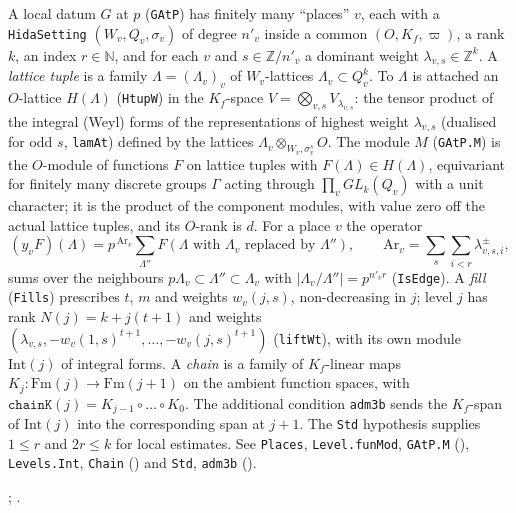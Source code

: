 \begin{definition}\label{def:G-local-forms}
A local datum $G$ at $p$ (\texttt{GAtP}) has finitely many ``places'' $v$, each with a \texttt{HidaSetting}
$(W_v,Q_v,\sigma_v)$ of degree $n'_v$ inside a common $(O,K_f,\varpi)$, a rank $k$, an index $r\in\mathbb N$, and for each
$v$ and $s\in\mathbb Z/n'_v$ a dominant weight $\lambda_{v,s}\in\mathbb Z^{k}$. A \emph{lattice tuple} is a family
$\Lambda=(\Lambda_v)_v$ of $W_v$-lattices $\Lambda_v\subset Q_v^{k}$. To $\Lambda$ is attached an $O$-lattice
$H(\Lambda)$ (\texttt{HtupW}) in the $K_f$-space $V=\bigotimes_{v,s}V_{\lambda_{v,s}}$: the tensor product of the
integral (Weyl) forms of the representations of highest weight $\lambda_{v,s}$ (dualised for odd $s$,
\texttt{lamAt}) defined by the lattices $\Lambda_v\otimes_{W_v,\sigma_v^{s}}O$.
The module $M$ (\texttt{GAtP.M}) is the $O$-module of functions $F$ on lattice tuples with $F(\Lambda)\in H(\Lambda)$,
equivariant for finitely many discrete groups $\Gamma$ acting through $\prod_v GL_k(Q_v)$ with a unit character;
it is the product of the component modules, with value zero off the actual lattice tuples, and its $O$-rank is $d$. For a place $v$ the operator
\[
  (y_vF)(\Lambda)=p^{\,\mathrm{Ar}_v}\sum_{\Lambda''}F(\Lambda\text{ with }\Lambda_v\text{ replaced by }\Lambda''),
  \qquad \mathrm{Ar}_v=\sum_{s}\sum_{i<r}\lambda^{\pm}_{v,s,i},
\]
sums over the neighbours $p\Lambda_v\subset\Lambda''\subset\Lambda_v$ with $|\Lambda_v/\Lambda''|=p^{n'_vr}$
(\texttt{IsEdge}). A \emph{fill} (\texttt{Fills}) prescribes $t$, $m$ and weights $w_{v}(j,s)$, non-decreasing in
$j$; level $j$ has rank $N(j)=k+j(t+1)$ and weights $(\lambda_{v,s},-w_v(1,s)^{t+1},\dots,-w_v(j,s)^{t+1})$
(\texttt{liftWt}), with its own module $\mathrm{Int}(j)$ of integral forms. A \emph{chain} is a family of
$K_f$-linear maps $K_j:\mathrm{Fm}(j)\to\mathrm{Fm}(j+1)$ on the ambient function spaces, with
$\texttt{chainK}(j)=K_{j-1}\circ\dots\circ K_0$. The additional condition \texttt{adm3b}
sends the $K_f$-span of $\mathrm{Int}(j)$ into the corresponding span at $j+1$. The \texttt{Std}
hypothesis supplies $1\le r$ and $2r\le k$ for local estimates.
See \texttt{Places}, \texttt{Level.funMod}, \texttt{GAtP.M} (),
\texttt{Levels.Int}, \texttt{Chain} () and
\texttt{Std}, \texttt{adm3b} ().
\par{\small {}; .}\par
\end{definition}

